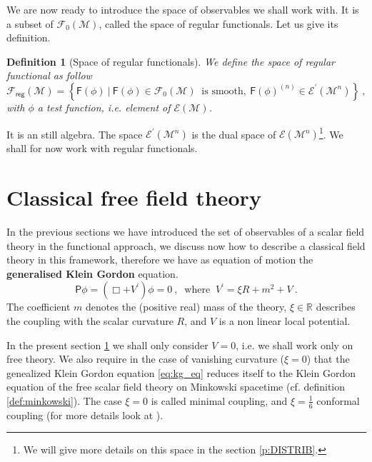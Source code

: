 \documentclass[11pt]{book}
\newcommand{\Ecal}{\mathcal{E}}
\newcommand{\Fcal}{\mathcal{F}}
\newcommand{\Mcal}{\mathcal{M}}
\newcommand{\Rbb}{\mathbb{R}}
\newcommand{\Fsf}{\mathsf{F}}
\newcommand{\Psf}{\mathsf{P}}
\theoremstyle{break}
\newtheorem{definition}{Definition}[chapter]
\begin{document}
We are now ready to introduce the space of observables we shall work with. It is a subset of $\Fcal_0(\Mcal)$, called the space of regular functionals. Let us give its definition.


\begin{definition}[Space of regular functionals]\label{def:obs_reg}
We define the space of regular functional as follow
\begin{equation*}
\Fcal_{\mathsf{reg}}(\Mcal) = \left\{ \Fsf(\phi) \ \bigg| \ \Fsf(\phi) \in \Fcal_0(\Mcal) \ \mbox{ is smooth}, \ \Fsf(\phi)^{(n)} \in \Ecal^\prime(\Mcal^{n}) \right\} \ ,
\end{equation*}
with $\phi$ a test function, i.e. element of $\Ecal(\Mcal)$.
\end{definition}


It is an still algebra. The space $\Ecal^\prime(\Mcal^{n})$ is the dual space of $\Ecal(\Mcal^{n})$\footnote{We will give more details on this space in the section \ref{p:DISTRIB}.}. We shall for now work with regular functionals. 


\section{Classical free field theory}\label{p:CLASSICAL}


In the previous sections we have introduced the set of observables of a scalar field theory in the functional approach, we discuss now how to describe a classical field theory in this framework, therefore we have as equation of motion the \textbf{generalised Klein Gordon} equation.
%
\begin{equation} 
\Psf \phi = \left( \Box + V^\prime \right) \phi = 0 \ , \
\mbox{ where } \ V^\prime = \xi R + m^2 + V \ . 
\label{eq:kg_eq}
\end{equation}
%
The coefficient $m$ denotes the (positive real) mass of the theory, $\xi \in \Rbb$ describes the coupling with the scalar curvature $R$, and $V$ is a non linear local potential.


In the present section \ref{p:CLASSICAL} we shall only consider $V=0$, i.e. we shall work only on free theory. We also require in the case of vanishing curvature ($\xi=0$) that the genealized Klein Gordon equation \eqref{eq:kg_eq} reduces itself to the Klein Gordon equation of the free scalar field theory on Minkowski spacetime (cf. definition \ref{def:minkowski}). The case $\xi=0$ is called minimal coupling, and $\xi=\frac16$ conformal coupling (for more details look at \cite{waldGR}).
\end{document}
